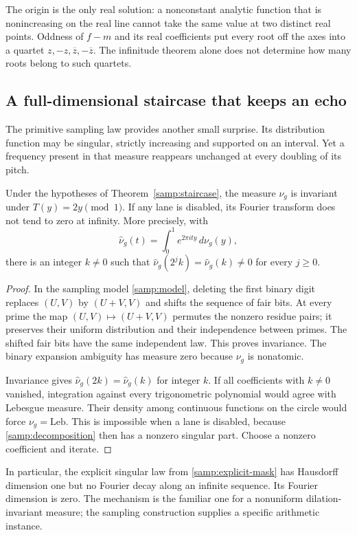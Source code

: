The origin is the only real solution: a nonconstant analytic
function that is nonincreasing on the real line cannot take the
same value at two distinct real points.  Oddness of $f-m$ and its
real coefficients put every root off the axes into a quartet
$z,-z,\overline z,-\overline z$.  The infinitude theorem alone
does not determine how many roots belong to such quartets.

\subsection{A full-dimensional staircase that keeps an echo}

The primitive sampling law provides another small surprise.  Its
distribution function may be singular, strictly increasing and
supported on an interval.  Yet a frequency present in that measure
reappears unchanged at every doubling of its pitch.

\begin{proposition}\label{play:echoes}
Under the hypotheses of Theorem~\ref{samp:staircase}, the measure
$\nu_g$ is invariant under $T(y)=2y\pmod1$.  If any lane is
disabled, its Fourier transform does not tend to zero at infinity.
More precisely, with
\[
 \widehat\nu_g(t)=\int_0^1e^{2\pi ity}\,d\nu_g(y),
\]
there is an integer $k\ne0$ such that
$\widehat\nu_g(2^jk)=\widehat\nu_g(k)\ne0$ for every $j\ge0$.
\end{proposition}
\begin{proof}
In the sampling model \eqref{samp:model}, deleting the first
binary digit replaces $(U,V)$ by $(U+V,V)$ and shifts the sequence
of fair bits.  At every prime the map $(U,V)\mapsto(U+V,V)$
permutes the nonzero residue pairs; it preserves their uniform
distribution and their independence between primes.  The shifted
fair bits have the same independent law.  This proves invariance.
The binary expansion ambiguity has measure zero because $\nu_g$
is nonatomic.

Invariance gives $\widehat\nu_g(2k)=\widehat\nu_g(k)$ for
integer $k$.  If all coefficients with $k\ne0$ vanished, integration
against every trigonometric polynomial would agree with Lebesgue
measure.  Their density among continuous functions on the circle
would force $\nu_g=\mathrm{Leb}$.  This is impossible when a lane
is disabled, because \eqref{samp:decomposition} then has a
nonzero singular part.  Choose a nonzero coefficient and iterate.
\end{proof}

In particular, the explicit singular law from
\eqref{samp:explicit-mask} has Hausdorff dimension one but no
Fourier decay along an infinite sequence.  Its Fourier dimension
is zero.  The mechanism is the familiar one for a nonuniform
dilation-invariant measure; the sampling construction supplies a
specific arithmetic instance.

